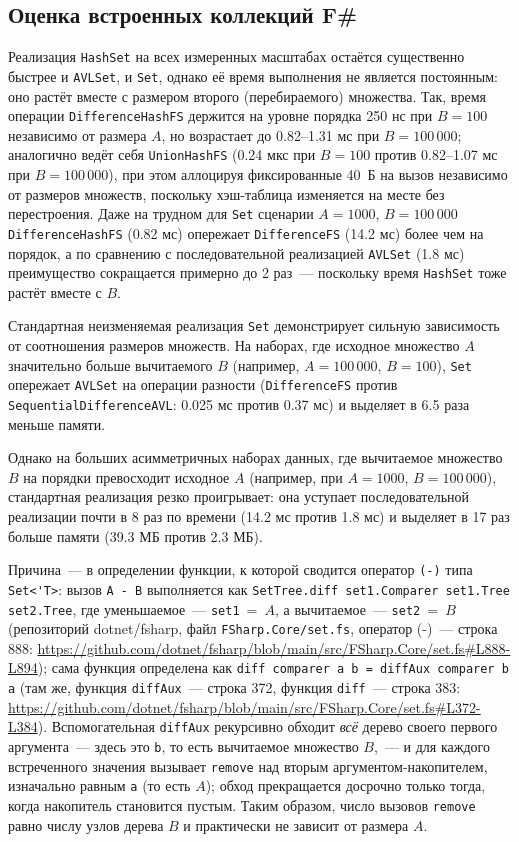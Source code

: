 \documentclass[a4paper,12pt]{article}
\begin{document}
\subsection{Оценка встроенных коллекций F\#}
Реализация \verb|HashSet| на всех измеренных масштабах остаётся существенно быстрее и \verb|AVLSet|, и \verb|Set|, однако её время выполнения не является постоянным: оно растёт вместе с размером второго (перебираемого) множества. Так, время операции \verb|DifferenceHashFS| держится на уровне порядка 250 нс при $B=100$ независимо от размера $A$, но возрастает до 0.82--1.31 мс при $B=100\,000$; аналогично ведёт себя \verb|UnionHashFS| (0.24 мкс при $B=100$ против 0.82--1.07 мс при $B=100\,000$), при этом аллоцируя фиксированные 40~Б на вызов независимо от размеров множеств, поскольку хэш-таблица изменяется на месте без перестроения. Даже на трудном для \verb|Set| сценарии $A=1000$, $B=100\,000$ \verb|DifferenceHashFS| (0.82 мс) опережает \verb|DifferenceFS| (14.2 мс) более чем на порядок, а по сравнению с последовательной реализацией \verb|AVLSet| (1.8 мс) преимущество сокращается примерно до 2 раз~--- поскольку время \verb|HashSet| тоже растёт вместе с $B$.

Стандартная неизменяемая реализация \verb|Set| демонстрирует сильную зависимость от соотношения размеров множеств. На наборах, где исходное множество $A$ значительно больше вычитаемого $B$ (например, $A=100\,000$, $B=100$), \verb|Set| опережает \verb|AVLSet| на операции разности (\verb|DifferenceFS| против \verb|SequentialDifferenceAVL|: 0.025 мс против 0.37 мс) и выделяет в 6.5 раза меньше памяти.

Однако на больших асимметричных наборах данных, где вычитаемое множество $B$ на порядки превосходит исходное $A$ (например, при $A=1000$, $B=100\,000$), стандартная реализация резко проигрывает: она уступает последовательной реализации почти в 8 раз по времени (14.2 мс против 1.8 мс) и выделяет в 17 раз больше памяти (39.3 МБ против 2.3 МБ).

Причина~--- в определении функции, к которой сводится оператор \verb|(-)| типа \verb|Set<'T>|: вызов \verb|A - B| выполняется как \verb|SetTree.diff set1.Comparer set1.Tree set2.Tree|, где уменьшаемое~--- \verb|set1|~=~$A$, а вычитаемое~--- \verb|set2|~=~$B$ (репозиторий dotnet/fsharp, файл \verb|FSharp.Core/set.fs|, оператор (-)~--- строка 888: \url{https://github.com/dotnet/fsharp/blob/main/src/FSharp.Core/set.fs#L888-L894}); сама функция определена как \verb|diff comparer a b = diffAux comparer b a| (там же, функция \verb|diffAux|~--- строка 372, функция \verb|diff|~--- строка 383: \url{https://github.com/dotnet/fsharp/blob/main/src/FSharp.Core/set.fs#L372-L384}). Вспомогательная \verb|diffAux| рекурсивно обходит \emph{всё} дерево своего первого аргумента~--- здесь это \verb|b|, то есть вычитаемое множество $B$,~--- и для каждого встреченного значения вызывает \verb|remove| над вторым аргументом-накопителем, изначально равным \verb|a| (то есть $A$); обход прекращается досрочно только тогда, когда накопитель становится пустым. Таким образом, число вызовов \verb|remove| равно числу узлов дерева $B$ и практически не зависит от размера $A$.
\end{document}
